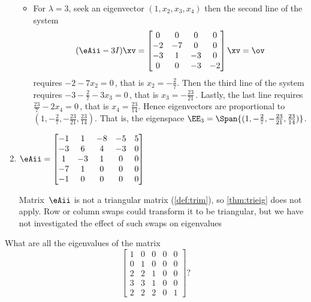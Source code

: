 \begin{example}
\begin{enumerate}
\begin{reduce}
\begin{solution}
\begin{itemize}
\item For \(\lambda=3\), seek an eigenvector \((1,x_2,x_3,x_4)\) then the second line of the system
\begin{equation*}
(\eAii-3I)\xv=
\begin{bmatrix}0&0&0&0
\\-2&-7&0&0
\\-3&1&-3&0
\\0&0&-3&-2 \end{bmatrix}\xv=\ov
\end{equation*}
requires \(-2-7x_2=0\)\,, that is \(x_2=-\frac27\).
Then the third line of the system requires \(-3-\frac27-3x_3=0\)\,, that is \(x_3=-\frac{23}{21}\)\,. 
Lastly, the last line requires \(\frac{23}7-2x_4=0\)\,, that is \(x_4=\frac{23}{14}\).
Hence eigenvectors are proportional to \((1,-\frac27,-\frac{23}{21},\frac{23}{14})\).
That is, the eigenspace \(\EE_{3}=\Span\{(1,-\frac27,-\frac{23}{21},\frac{23}{14})\}\).

\end{itemize}
\end{solution}
\end{reduce}

\item \(\eAii=\begin{bmatrix} -1&1&-8&-5&5
\\-3&6&4&-3&0
\\1&-3&1&0&0
\\-7&1&0&0&0
\\-1&0&0&0&0 \end{bmatrix}\)
\begin{solution} 
Matrix~\(\eAii\) is not a triangular matrix (\cref{def:trim}), so \cref{thm:trieig} does not apply.
Row or column swaps could transform it to be triangular, but we have not investigated the effect of such swaps on eigenvalues 
\end{solution}
\end{enumerate}
\end{example}




\begin{activity}
What are all the eigenvalues of the matrix
\begin{equation*}
\begin{bmatrix} 1&0&0&0&0
\\0&1&0&0&0
\\2&2&1&0&0
\\3&3&1&0&0
\\2&2&2&0&1
 \end{bmatrix}?
\end{equation*}
\end{activity}






